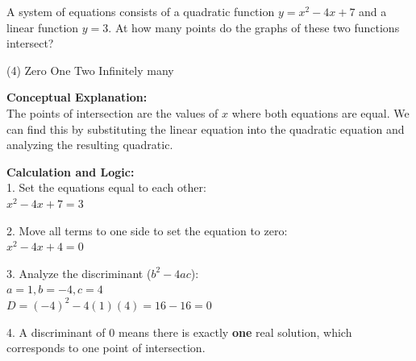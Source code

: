 \documentclass[11pt,paper=a4,answers]{exam}
\begin{document}
\begin{questions}
\pointsinrightmargin
\pointsdroppedatright
\marksnotpoints
{}
\pointformat{\boldmath\themarginpoints}
\bracketedpoints



\question
A system of equations consists of a quadratic function $y = x^2 - 4x + 7$ and a linear function $y = 3$. At how many points do the graphs of these two functions intersect?
\begin{tasks}(4)
    \task Zero
    \task One
    \task Two
    \task Infinitely many
\end{tasks}

\begin{solution}
\textbf{Conceptual Explanation:} \\
The points of intersection are the values of $x$ where both equations are equal. We can find this by substituting the linear equation into the quadratic equation and analyzing the resulting quadratic.

\vspace{20pt}

\textbf{Calculation and Logic:} \\
1. Set the equations equal to each other: \\
   $x^2 - 4x + 7 = 3$

\vspace{10pt}

2. Move all terms to one side to set the equation to zero: \\
   $x^2 - 4x + 4 = 0$

\vspace{10pt}

3. Analyze the discriminant ($b^2 - 4ac$): \\
   $a = 1, b = -4, c = 4$ \\
   $D = (-4)^2 - 4(1)(4) = 16 - 16 = 0$

\vspace{10pt}

4. A discriminant of 0 means there is exactly \textbf{one} real solution, which corresponds to one point of intersection.


\end{solution}
\end{questions}
\end{document}
